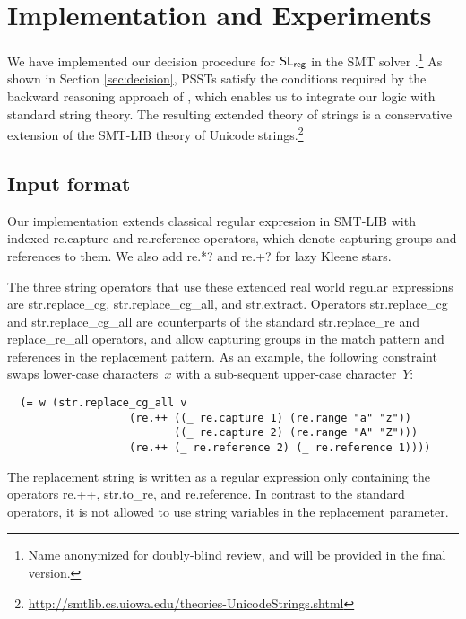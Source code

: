 
\section{Implementation and Experiments}
\label{sect:impl}

We have implemented our decision procedure for $\mathsf{SL}_{\sf reg}$ in the SMT
solver \ostrich.\footnote{Name anonymized for doubly-blind review,
and will be provided in the final version.}
As shown in Section \ref{sec:decision},
PSSTs satisfy the conditions required by the backward reasoning
approach of \ostrich, which enables us to integrate our logic with
standard string theory. The resulting extended theory of strings is a
conservative extension of the SMT-LIB theory of Unicode
strings.\footnote{\url{http://smtlib.cs.uiowa.edu/theories-UnicodeStrings.shtml}}

\subsection{Input format}

Our implementation extends classical regular expression in SMT-LIB
with indexed {\sf re.capture} and {\sf re.reference} operators, which
denote capturing groups and references to them. We also add {\sf re.*?}
and {\sf re.+?} for lazy Kleene stars.

The three string operators that use these extended real world regular
expressions are {\sf str.replace\_cg}, {\sf str.replace\_cg\_all}, and
{\sf str.extract}. Operators {\sf str.replace\_cg} and {\sf
  str.replace\_cg\_all} are counterparts of the standard {\sf
  str.replace\_re} and {\sf replace\_re\_all} operators, and allow
capturing groups in the match pattern and references in the
replacement pattern. As an example, the following constraint swaps
lower-case characters~$x$ with a sub-sequent upper-case character~$Y$:
%
\begin{verbatim}
  (= w (str.replace_cg_all v
                   (re.++ ((_ re.capture 1) (re.range "a" "z"))
                          ((_ re.capture 2) (re.range "A" "Z")))
                   (re.++ (_ re.reference 2) (_ re.reference 1))))
\end{verbatim}
%
The replacement string is written as a regular expression only
containing the operators {\sf re.++}, {\sf str.to\_re}, and {\sf re.reference}. In contrast to the standard operators, it is not allowed to use string variables in the 
replacement parameter.

